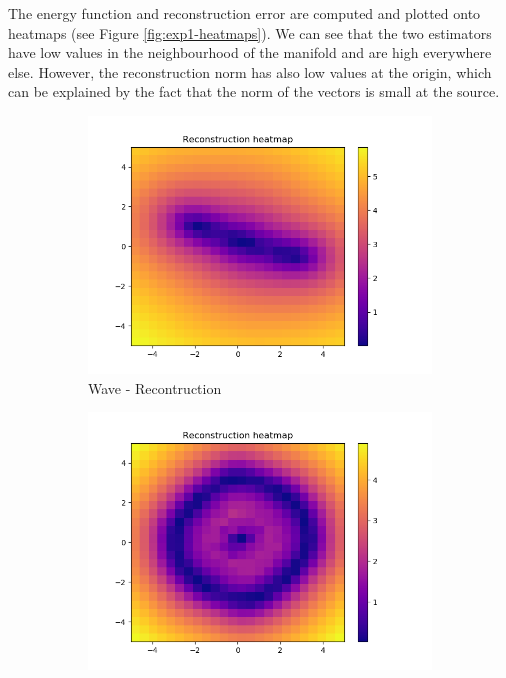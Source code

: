 The energy function and reconstruction error are computed and plotted onto heatmaps (see Figure \ref{fig:exp1-heatmaps}). We can see that the two estimators have low values in the neighbourhood of the manifold and are high everywhere else. However, the reconstruction norm has also low values at the origin, which can be explained by the fact that the norm of the vectors is small at the source.
\begin{figure}[!h]
\centering
\begin{subfigure}{.5\textwidth}
  \centering
  \includegraphics[width=.95\linewidth]{figures/wave-quantifier-reconstruction}
  \caption{Wave - Recontruction}
\end{subfigure}%
\begin{subfigure}{.5\textwidth}
  \centering
  \includegraphics[width=.95\linewidth]{figures/circle-quantifier-reconstruction}

\end{subfigure}
\end{figure}
